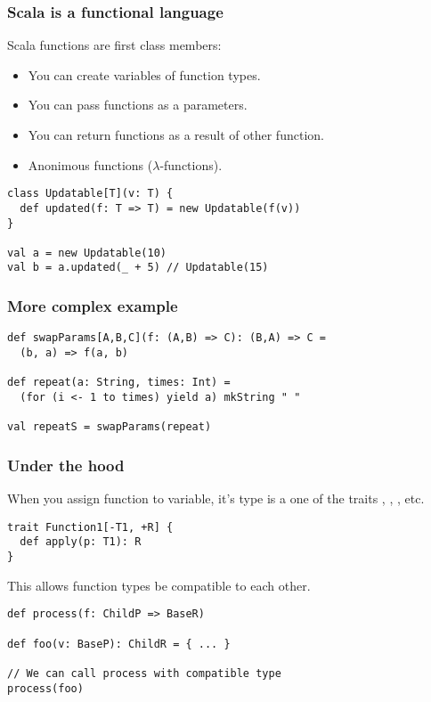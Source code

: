 \begin{frame}[fragile]
\frametitle{Scala is a functional language}
  Scala functions are first class members:
  \begin{itemize}
    \item You can create variables of function types.
    \item You can pass functions as a parameters.
    \item You can return functions as a result of other function.
    \item Anonimous functions ($\lambda$-functions).
  \end{itemize}
  \begin{example}
\begin{lstlisting}
class Updatable[T](v: T) {
  def updated(f: T => T) = new Updatable(f(v))
}

val a = new Updatable(10)
val b = a.updated(_ + 5) // Updatable(15)
\end{lstlisting}
  \end{example}
\end{frame}

\begin{frame}[fragile]
\frametitle{More complex example}

    \begin{lstlisting}
def swapParams[A,B,C](f: (A,B) => C): (B,A) => C = 
  (b, a) => f(a, b)

def repeat(a: String, times: Int) = 
  (for (i <- 1 to times) yield a) mkString " "

val repeatS = swapParams(repeat)
    \end{lstlisting}

\end{frame}

\begin{frame}[fragile]
\frametitle{Under the hood}

When you assign function to variable, it's type is a one of the traits , , , etc.
\begin{lstlisting}
trait Function1[-T1, +R] {
  def apply(p: T1): R
}
\end{lstlisting}
This allows function types be compatible to each other.
\begin{example}
\begin{lstlisting}
def process(f: ChildP => BaseR)

def foo(v: BaseP): ChildR = { ... }

// We can call process with compatible type
process(foo)
\end{lstlisting}
\end{example}

\end{frame}

